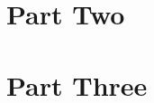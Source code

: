 \documentclass[a4paper, 11pt]{article}
\begin{document}

\newpage
\section{Part Two}


\newpage
\section{Part Three}
\end{document}
